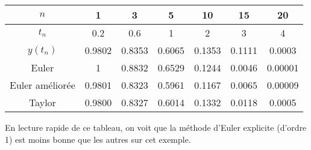 \begin{enumerate}
{		\begin{tabular}{|c|c|c|c|c|c|c|}
			\hline 
			$n$ & 1 & 3 & 5 & 10 & 15 & 20 \\ 
			\hline 
			$t_n$ & 0.2 & 0.6 & 1 & 2 & 3 & 4 \\ 
			\hline 
			$y(t_n)$ & 0.9802 & 0.8353 & 0.6065 & 0.1353 & 0.1111 & 0.0003 \\ 
			\hline 
			Euler & 1 & 0.8832 & 0.6529 & 0.1244 & 0.0046 & 0.00001 \\ 
			\hline 
			Euler améliorée & 0.9801 & 0.8323 & 0.5961 & 0.1167 & 0.0065 & 0.00009 \\ 
			\hline 
			Taylor & 0.9800 & 0.8327 & 0.6014 & 0.1332 & 0.0118 & 0.0005 \\ 
			\hline 
		\end{tabular} 
		
		En lecture rapide de ce tableau, on voit que la méthode d'Euler explicite (d'ordre 1) est moins bonne que les autres sur cet exemple.}
\end{enumerate}